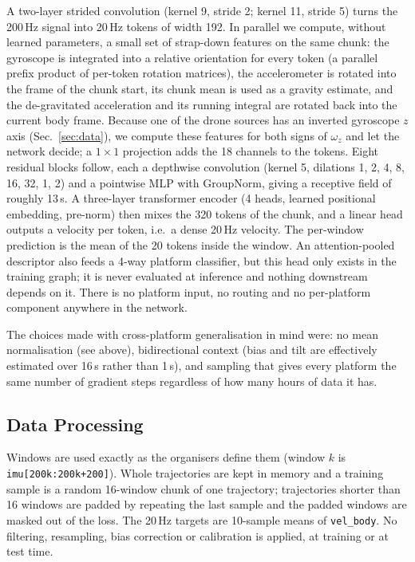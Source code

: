 \documentclass[letterpaper,10pt,conference]{ieeeconf}
\begin{document}
A two-layer strided convolution (kernel 9, stride 2; kernel 11, stride 5) turns the 200\,Hz signal into 20\,Hz
tokens of width 192. In parallel we compute, without learned parameters, a small set of strap-down features on the
same chunk: the gyroscope is integrated into a relative orientation for every token (a parallel prefix product of
per-token rotation matrices), the accelerometer is rotated into the frame of the chunk start, its chunk mean is used
as a gravity estimate, and the de-gravitated acceleration and its running integral are rotated back into the current
body frame. Because one of the drone sources has an inverted gyroscope $z$ axis (Sec.~\ref{sec:data}), we compute
these features for both signs of $\omega_z$ and let the network decide; a $1\times1$ projection adds the 18 channels
to the tokens. Eight residual blocks follow, each a depthwise convolution (kernel 5, dilations 1, 2, 4, 8, 16, 32, 1,
2) and a pointwise MLP with GroupNorm, giving a receptive field of roughly 13\,s. A three-layer transformer encoder
(4 heads, learned positional embedding, pre-norm) then mixes the 320 tokens of the chunk, and a linear head outputs a
velocity per token, i.e.\ a dense 20\,Hz velocity. The per-window prediction is the mean of the 20 tokens inside the
window. An attention-pooled descriptor also feeds a 4-way platform classifier, but this head only exists in the
training graph; it is never evaluated at inference and nothing downstream depends on it. There is no platform input,
no routing and no per-platform component anywhere in the network.

The choices made with cross-platform generalisation in mind were: no mean normalisation (see above), bidirectional
context (bias and tilt are effectively estimated over 16\,s rather than 1\,s), and sampling that gives every platform
the same number of gradient steps regardless of how many hours of data it has.

\subsection{Data Processing}
Windows are used exactly as the organisers define them (window $k$ is \texttt{imu[200k:200k+200]}). Whole
trajectories are kept in memory and a training sample is a random 16-window chunk of one trajectory; trajectories
shorter than 16 windows are padded by repeating the last sample and the padded windows are masked out of the loss.
The 20\,Hz targets are 10-sample means of \texttt{vel\_body}. No filtering, resampling, bias correction or
calibration is applied, at training or at test time.
\end{document}
